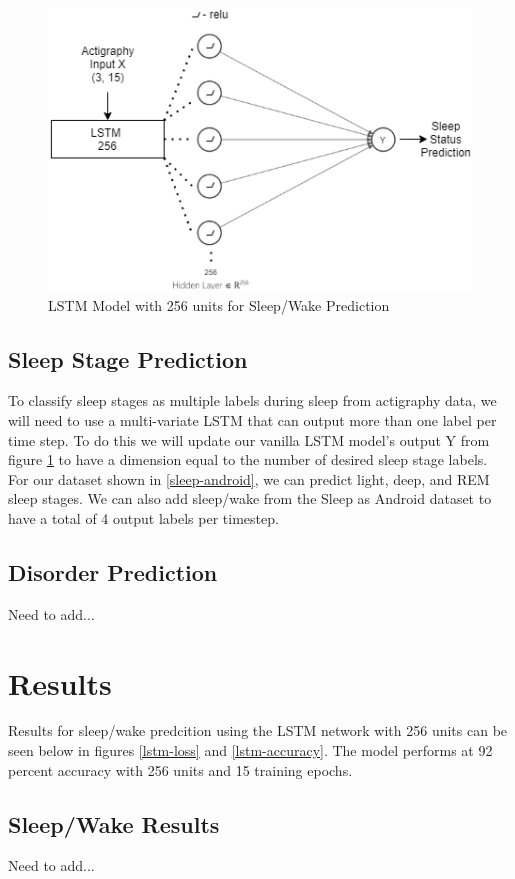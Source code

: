 \documentclass[12pt]{report}
\begin{document}
\begin{figure}
  \begin{center}
    \includegraphics[width=0.7\linewidth]{sleep_status_LSTM_model}
    \caption{LSTM Model with 256 units for Sleep/Wake Prediction}
    \label{lstm-architecture}
  \end{center}
\end{figure}

\section{Sleep Stage Prediction}
To classify sleep stages as multiple labels during sleep from actigraphy data, we will need to use a multi-variate LSTM that can output more than one label per time step. To do this we will update our vanilla LSTM model's output Y from figure \ref{lstm-architecture} to have a dimension equal to the number of desired sleep stage labels. For our dataset shown in \ref{sleep-android}, we can predict light, deep, and REM sleep stages. We can also add sleep/wake from the Sleep as Android dataset to have a total of 4 output labels per timestep. 

\section{Disorder Prediction}
Need to add...

\chapter{Results}

Results for sleep/wake predcition using the LSTM network with 256 units can be seen below in figures \ref{lstm-loss} and \ref{lstm-accuracy}. The model performs at 92 percent accuracy with 256 units and 15 training epochs. 

\section{Sleep/Wake Results}
Need to add...
\end{document}
